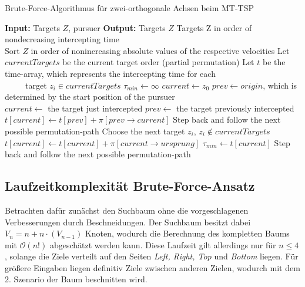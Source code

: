 \documentclass[german,version-2019-11]{uzl-thesis}
\begin{document}
\begin{minipage}{1\linewidth}
\begin{algorithm}[H]
\begin{algorithmic}
\caption{Brute-Force-Algorithmus für zwei-orthogonale Achsen beim MT-TSP}
\label{alg:BF}
\State \textbf{Input:} Targets $Z$, pursuer
\State \textbf{Output:} Targets $Z$ Targets Z in order of nondecreasing intercepting time\\

\State Sort $Z$ in order of nonincreasing absolute values of the respective velocities
\State Let $currentTargets$ be the current target order (partial permutation)
\State Let $t$ be the time-array, which represents the intercepting time for each \\
~~~~~target $z_i\in currentTargets$ 
\State $\tau_{min}\leftarrow \infty$
\State $current\leftarrow z_0$
\State $prev\leftarrow origin$, which is determined by the start position of the pursuer\\

\State $current\leftarrow$ the target just intercepted
\State $prev\leftarrow$ the target previously intercepted 
\State $t[current] \leftarrow t[prev] + \pi[prev\rightarrow current]$
\State Step back and follow the next possible permutation-path
\Else
{}
\State Choose the next target $z_i$, $z_i\notin currentTargets$
\Else
\State $t[current]\leftarrow t[current] + \pi[current\rightarrow ursprung]$ 
\State $\tau_{min}\leftarrow t[current]$
\State Step back and follow the next possible permutation-path
\EndIf 
\EndIf
\EndIf
\EndWhile
\end{algorithmic}
\end{algorithm}
\end{minipage}

\subsection{Laufzeitkomplexität Brute-Force-Ansatz}
Betrachten dafür zunächst den Suchbaum ohne die vorgeschlagenen Verbesserungen durch Beschneidungen. Der Suchbaum besitzt dabei $V_n = n + n\cdot (V_{n-1})$ Knoten, wodurch die Berechnung des kompletten Baums mit $\mathcal{O}(n!)$ abgeschätzt werden kann. 
Diese Laufzeit gilt allerdings nur für $n\leq 4$, solange die Ziele verteilt auf den Seiten \emph{Left, Right, Top} und \emph{Bottom} liegen. Für größere Eingaben liegen definitiv Ziele zwischen anderen Zielen, wodurch mit dem 2. Szenario der Baum beschnitten wird. 
\end{document}
